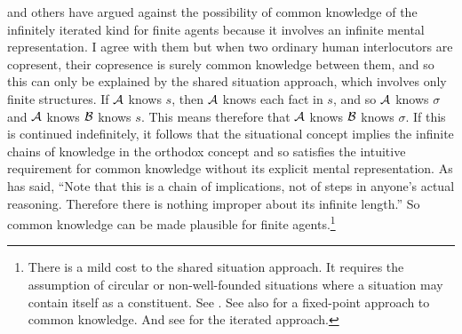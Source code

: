\citet[14]{gintis:gte} and others have argued against the possibility of common knowledge of the infinitely iterated kind for finite agents because it involves an infinite mental representation. I agree with them but when two ordinary human interlocutors are copresent, their copresence is surely common knowledge between them, and so this can only be explained by the shared situation approach, which involves only finite structures. If $\cal A$ knows $s$, then $\cal A$ knows each fact in $s$, and so $\cal A$ knows $\sigma$ and $\cal A$ knows $\cal B$ knows $s$. This means therefore that $\cal A$ knows $\cal B$ knows $\sigma$. If this is continued indefinitely, it follows that the situational concept implies the infinite chains of knowledge in the orthodox concept and so satisfies the intuitive requirement for common knowledge without its explicit mental representation. As \citet[53]{lewis:c} has said, ``Note that this is a chain of implications, not of steps in anyone's actual reasoning. Therefore there is nothing improper about its infinite length.'' So common knowledge can be made plausible for finite agents.\footnote{There is a mild cost to the shared situation approach. It requires the assumption of circular or non-well-founded situations where a situation may contain itself as a constituent. See \citet{be:liar}. See also \citet[Section~11.5]{fhmv:rk} for a fixed-point approach to common knowledge. \label{foot:nonwellfounded} And see \citet{clark:defref} for the iterated approach.}


